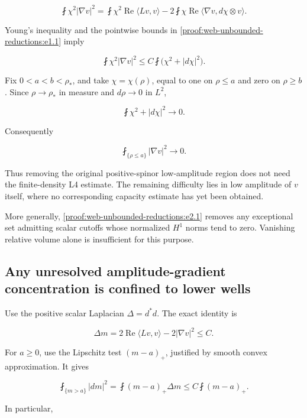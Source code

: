 \[
 \fint\chi^2|\nabla v|^2
 =\fint\chi^2\operatorname{Re}\langle Lv,v\rangle
 -2\fint\chi\operatorname{Re}\langle\nabla v,d\chi\otimes v\rangle.
\]

Young's inequality and the pointwise bounds in \eqref{proof:web-unbounded-reductions:e1.1} imply

\[
 \boxed{\fint\chi^2|\nabla v|^2
 \le C\fint\bigl(\chi^2+|d\chi|^2\bigr).}
 \tag{\thesection.2.1}\label{proof:web-unbounded-reductions:e2.1}
\]

Fix \(0<a<b<\rho_*\), and take \(\chi=\chi(\rho)\), equal to one on \(\rho\le a\) and zero on \(\rho\ge b\). Since \(\rho\to\rho_*\) in measure and \(d\rho\to0\) in \(L^2\),

\[
 \fint\chi^2+|d\chi|^2\longrightarrow0.
\]

Consequently

\[
 \boxed{\fint_{\{\rho\le a\}}|\nabla v|^2\longrightarrow0.}
 \tag{\thesection.2.2}\label{proof:web-unbounded-reductions:e2.2}
\]

Thus removing the original positive-spinor low-amplitude region does not need the finite-density L4 estimate. The remaining difficulty lies in low amplitude of \(v\) itself, where no corresponding capacity estimate has yet been obtained.

More generally, \eqref{proof:web-unbounded-reductions:e2.1} removes any exceptional set admitting scalar cutoffs whose normalized \(H^1\) norms tend to zero. Vanishing relative volume alone is insufficient for this purpose.

\hypertarget{proof:web-unbounded-reductions:s3}{%
\subsection{Any unresolved amplitude-gradient concentration is confined to lower wells}\label{proof:web-unbounded-reductions:s3}}

Use the positive scalar Laplacian \(\Delta=d^*d\). The exact identity is

\[
 \Delta m=2\operatorname{Re}\langle Lv,v\rangle-2|\nabla v|^2\le C.
 \tag{\thesection.3.1}\label{proof:web-unbounded-reductions:e3.1}
\]

For \(a\ge0\), use the Lipschitz test \((m-a)_+\), justified by smooth convex approximation. It gives

\[
 \fint_{\{m>a\}}|dm|^2
 =\fint(m-a)_+\Delta m
 \le C\fint(m-a)_+.
 \tag{\thesection.3.2}\label{proof:web-unbounded-reductions:e3.2}
\]

In particular,

